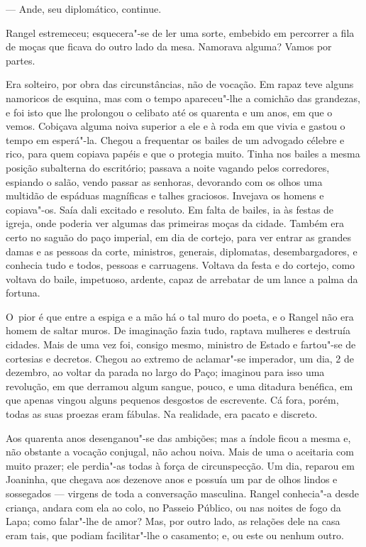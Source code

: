 \begin{linenumbers}
--- Ande, seu diplomático, continue.

Rangel estremeceu; esquecera"-se de ler uma sorte, embebido em percorrer
a fila de moças que ficava do outro lado da mesa. Namorava alguma? Vamos
por partes.

Era solteiro, por obra das circunstâncias, não de vocação. Em rapaz teve
alguns namoricos de esquina, mas com o tempo apareceu"-lhe a comichão das
grandezas, e foi isto que lhe prolongou o celibato até os quarenta e um
anos, em que o vemos. Cobiçava alguma noiva superior a ele e à roda em
que vivia e gastou o tempo em esperá"-la. Chegou a frequentar os bailes
de um advogado célebre e rico, para quem copiava papéis e que o protegia
muito. Tinha nos bailes a mesma posição subalterna do escritório;
passava a noite vagando pelos corredores, espiando o salão, vendo passar
as senhoras, devorando com os olhos uma multidão de espáduas magníficas
e talhes graciosos. Invejava os homens e copiava"-os. Saía dali excitado
e resoluto. Em falta de bailes, ia às festas de igreja, onde poderia ver
algumas das primeiras moças da cidade. Também era certo no saguão do
paço imperial, em dia de cortejo, para ver entrar as grandes damas e as
pessoas da corte, ministros, generais, diplomatas, desembargadores, e
conhecia tudo e todos, pessoas e carruagens. Voltava da festa e do
cortejo, como voltava do baile, impetuoso, ardente, capaz de arrebatar
de um lance a palma da fortuna.

O~pior é que entre a espiga e a mão há o tal muro do poeta, e o Rangel
não era homem de saltar muros. De imaginação fazia tudo, raptava
mulheres e destruía cidades. Mais de uma vez foi, consigo mesmo,
ministro de Estado e fartou"-se de cortesias e decretos. Chegou ao
extremo de aclamar"-se imperador, um dia, 2 de dezembro, ao voltar da
parada no largo do Paço; imaginou para isso uma revolução, em que
derramou algum sangue, pouco, e uma ditadura benéfica, em que apenas
vingou alguns pequenos desgostos de escrevente. Cá fora, porém, todas as
suas proezas eram fábulas. Na realidade, era pacato e discreto.

Aos quarenta anos desenganou"-se das ambições; mas a índole ficou a mesma
e, não obstante a vocação conjugal, não achou noiva. Mais de uma o
aceitaria com muito prazer; ele perdia"-as todas à força de
circunspecção. Um dia, reparou em Joaninha, que chegava aos dezenove
anos e possuía um par de olhos lindos e sossegados --- virgens de toda a
conversação masculina. Rangel conhecia"-a desde criança, andara com ela
ao colo, no Passeio Público, ou nas noites de fogo da Lapa; como
falar"-lhe de amor? Mas, por outro lado, as relações dele na casa eram
tais, que podiam facilitar"-lhe o casamento; e, ou este ou nenhum outro.


\end{linenumbers}

